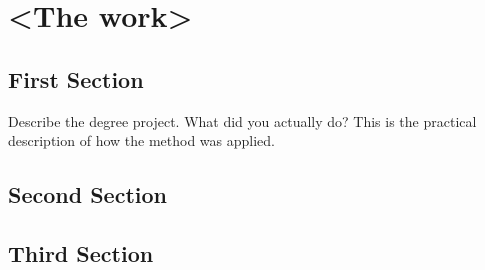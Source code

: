 \chapter{<The work>}
\section{First Section}
Describe the degree project. What did you actually do? This is the practical description of how the method was applied.

\section{Second Section}

\section{Third Section}